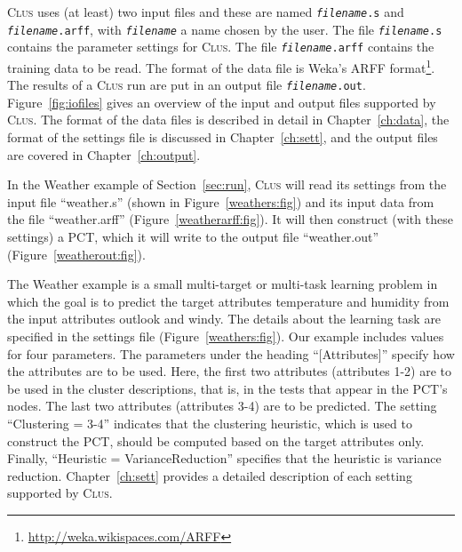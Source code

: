 \documentclass[a4paper]{report}
\newcommand{\clus}{\textsc{Clus}}
\begin{document}
\clus{} uses (at least) two input files and these are named {\tt {\em filename}.s} and {\tt {\em filename}.arff}, with {\tt {\em filename}} a name chosen by the user.  The file {\tt {\em filename}.s} contains the parameter settings for \clus{}.  The file {\tt {\em filename}.arff} contains the training data to be read. The format of the data file is Weka's ARFF format\footnote{\url{http://weka.wikispaces.com/ARFF}}. The results of a \clus{} run are put in an output file {\tt {\em filename}.out}. Figure~\ref{fig:iofiles} gives an overview of the input and output files supported by \clus{}. The format of the data files is described in detail in Chapter~\ref{ch:data}, the format of the settings file is discussed in Chapter~\ref{ch:sett}, and the output files are covered in Chapter~\ref{ch:output}. 

In the Weather example of Section~\ref{sec:run}, \clus{} will read its settings from the input file ``weather.s'' (shown in Figure~\ref{weathers:fig}) and its input data from the file ``weather.arff'' (Figure~\ref{weatherarff:fig}). It will then construct (with these settings) a PCT, which it will write to the output file ``weather.out'' (Figure~\ref{weatherout:fig}).

The Weather example is a small multi-target or multi-task learning problem \cite{Caruana97:jrnl} in which the goal is to predict the target attributes temperature and humidity from the input attributes outlook and windy. The details about the learning task are specified in the settings file (Figure~\ref{weathers:fig}). Our example includes values for four parameters. The parameters under the heading ``[Attributes]'' specify how the attributes are to be used. Here, the first two attributes (attributes 1-2) are to be used in the cluster descriptions, that is, in the tests that appear in the PCT's nodes. The last two attributes (attributes 3-4) are to be predicted. The setting ``Clustering = 3-4'' indicates that the clustering heuristic, which is used to construct the PCT, should be computed based on the target attributes only. Finally, ``Heuristic = VarianceReduction'' specifies that the heuristic is variance reduction. Chapter~\ref{ch:sett} provides a detailed description of each setting supported by \clus{}.
\end{document}
